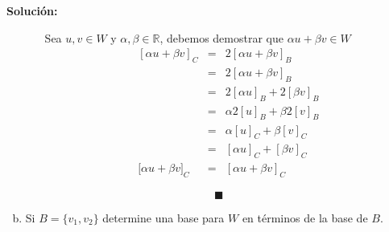 \documentclass[12pt]{article}
\newenvironment{solucion}
{\begin{mdframed}[backgroundcolor=black!10]
		{\bf Solución:}\\
	}
	{
	\end{mdframed}
}
\newenvironment{preguntas}
{\begin{enumerate}\itemsep12pt
	}
	{
	\end{enumerate}
}
\newcommand{\R}{\mathbb{R}}
\begin{document}
\begin{preguntas}
\begin{solucion}
\begin{enumerate}[a)]
\begin{enumerate}
				
				Sea $u, v \in W$ y $\alpha, \beta \in \R$, debemos demostrar que $\alpha u + \beta v \in W$
				$$\begin{array}{rcl}
				[\alpha u + \beta v]_C & = & 2 [\alpha u + \beta v]_B \\
				& = & 2 [\alpha u + \beta v]_B \\
				& = & 2 [\alpha u]_B + 2[\beta v]_B \\
				& = & \alpha 2[u]_B + \beta 2[v]_B \\
				& = & \alpha [u]_C + \beta [v]_C \\
				& = & [\alpha u]_C + [\beta v]_C \\
				{[}\alpha u + \beta v]_C & = & [\alpha u +\beta v]_C
				\end{array}
				$$
			\end{enumerate}
			$$\blacksquare$$
\item Si $B=\{v_1,v_2\}$ determine una base para $W$ en términos de la base de $B$.
			

\end{enumerate}
\end{solucion}
\end{preguntas}
\end{document}
